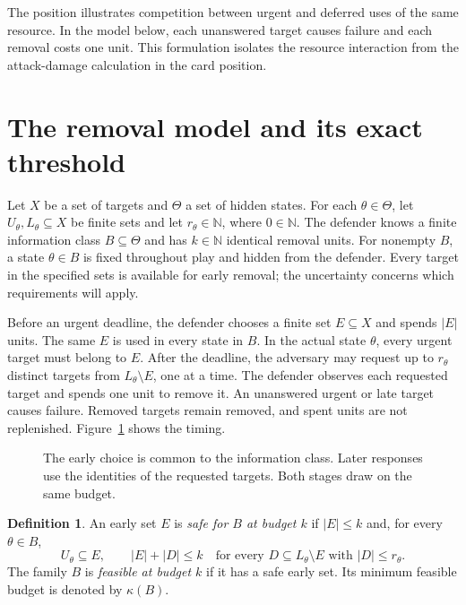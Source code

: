 \documentclass[11pt,a4paper]{amsart}
\theoremstyle{definition}
\newtheorem{definition}[theorem]{Definition}
\theoremstyle{remark}
\newcommand{\N}{\mathbb N}
\newcommand{\card}[1]{\lvert #1\rvert}
\begin{document}
The position illustrates competition between urgent and deferred uses of the
same resource. In the model below, each unanswered target causes failure and
each removal costs one unit. This formulation isolates the resource interaction
from the attack-damage calculation in the card position.

\section{The removal model and its exact threshold}\label{sec:model}

Let $X$ be a set of targets and $\Theta$ a set of hidden states. For each
$\theta\in\Theta$, let $U_\theta,L_\theta\subseteq X$ be finite sets and
let $r_\theta\in\N$, where $0\in\N$. The defender knows a finite information
class $B\subseteq\Theta$ and has $k\in\N$ identical removal units.
For nonempty $B$, a state $\theta\in B$ is fixed throughout play and hidden
from the defender. Every target in the specified sets is available for early
removal; the uncertainty concerns which requirements will apply.

Before an urgent deadline, the defender chooses a finite set $E\subseteq X$
and spends $\card E$ units. The same $E$ is used in every state in $B$.
In the actual state $\theta$, every urgent target must belong to $E$.
After the deadline, the adversary may request up to $r_\theta$ distinct
targets from $L_\theta\setminus E$, one at a time. The defender observes
each requested target and spends one unit to remove it. An unanswered
urgent or late target causes failure. Removed targets remain removed,
and spent units are not replenished. Figure~\ref{fig:timing} shows the timing.

\begin{figure}[htbp]
\centering

\caption{The early choice is common to the information class. Later
responses use the identities of the requested targets. Both stages draw
on the same budget.}
\label{fig:timing}
\end{figure}

\begin{definition}
An early set $E$ is \emph{safe for $B$ at budget $k$} if $\card E\le k$ and,
for every $\theta\in B$,
\begin{equation}\label{eq:safe}
 U_\theta\subseteq E,
 \qquad
 \card E+\card D\le k
 \quad\text{for every }D\subseteq L_\theta\setminus E
 \text{ with }\card D\le r_\theta.
\end{equation}
The family $B$ is \emph{feasible at budget $k$} if it has a safe early set.
Its minimum feasible budget is denoted by $\kappa(B)$.
\end{definition}
\end{document}
